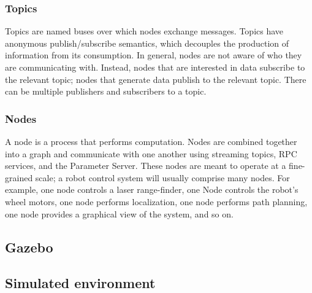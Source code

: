 \subsubsection{Topics}
Topics are named buses over which nodes exchange messages. Topics have anonymous publish/subscribe semantics, which decouples the production of information from its consumption. In general, nodes are not aware of who they are communicating with. Instead, nodes that are interested in data subscribe to the relevant topic; nodes that generate data publish to the relevant topic. There can be multiple publishers and subscribers to a topic.
\subsubsection{Nodes}
A node is a process that performs computation. Nodes are combined together into a graph and communicate with one another using streaming topics, RPC services, and the Parameter Server. These nodes are meant to operate at a fine-grained scale; a robot control system will usually comprise many nodes. For example, one node controls a laser range-finder, one Node controls the robot's wheel motors, one node performs localization, one node performs path planning, one node provides a graphical view of the system, and so on.
\subsection{Gazebo}
\subsection{Simulated environment}
